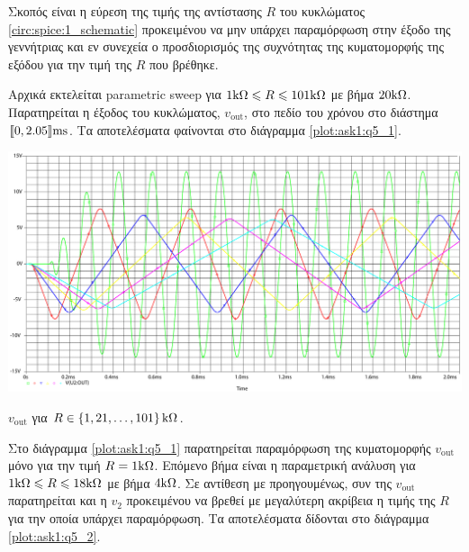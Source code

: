Σκοπός είναι η εύρεση της τιμής της αντίστασης $R$ του κυκλώματος \ref{circ:spice:1_schematic} προκειμένου να μην υπάρχει παραμόρφωση στην έξοδο της γεννήτριας και εν συνεχεία ο προσδιορισμός της συχνότητας της κυματομορφής της εξόδου για την τιμή της $R$ που βρέθηκε.\par
Αρχικά εκτελείται parametric sweep για $1\kohm\leqslant R\leqslant 101\kohm$ με βήμα $20\kohm$. Παρατηρείται η έξοδος του κυκλώματος, $v_{\mathrm{out}}$, στο πεδίο του χρόνου στο διάστημα $\lb 0,2.05 \rb\unit{\milli\second}$. Τα αποτελέσματα φαίνονται στο διάγραμμα \ref{plot:ask1:q5_1}.

\begin{chart}[H]
	\begin{center}
		\includegraphics[width=15cm]{spice_01/q5_1.pdf}
		\caption{$v_{\mathrm{out}}$ για $R\in\left\{1,21,\ldots,101\right\}\kohm$.}
		\label{plot:ask1:q5_1}
	\end{center}
\end{chart}

Στο διάγραμμα \ref{plot:ask1:q5_1} παρατηρείται παραμόρφωση της κυματομορφής $v_{\mathrm{out}}$ μόνο για την τιμή $R=1\kohm$. Επόμενο βήμα είναι η παραμετρική ανάλυση για $1\kohm\leqslant R\leqslant 18\kohm$ με βήμα $4\kohm$. Σε αντίθεση με προηγουμένως, συν της $v_{\mathrm{out}}$ παρατηρείται και η $v_2$ προκειμένου να βρεθεί με μεγαλύτερη ακρίβεια η τιμής της $R$ για την οποία υπάρχει παραμόρφωση. Τα αποτελέσματα δίδονται στο διάγραμμα \ref{plot:ask1:q5_2}.

